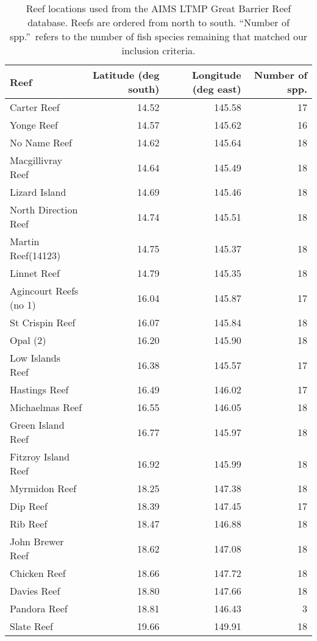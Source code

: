 \begin{table}[ht]
\begin{center}
\caption{Reef locations used from the AIMS LTMP Great Barrier Reef database. 
  Reefs are ordered from north to south. ``Number of spp.''\ refers to the 
  number of fish species remaining that matched our inclusion criteria.}
\label{tab:grb-meta}
{\footnotesize
\begin{tabular}{lrrr}
  \toprule
Reef & Latitude (deg south) & Longitude (deg east) & Number of spp. \\ 
  \midrule
Carter Reef & 14.52 & 145.58 & 17 \\ 
  Yonge Reef & 14.57 & 145.62 & 16 \\ 
  No Name Reef & 14.62 & 145.64 & 18 \\ 
  Macgillivray Reef & 14.64 & 145.49 & 18 \\ 
  Lizard Island & 14.69 & 145.46 & 18 \\ 
  North Direction Reef & 14.74 & 145.51 & 18 \\ 
  Martin Reef(14123) & 14.75 & 145.37 & 18 \\ 
  Linnet Reef & 14.79 & 145.35 & 18 \\ 
  Agincourt Reefs (no 1) & 16.04 & 145.87 & 17 \\ 
  St Crispin Reef & 16.07 & 145.84 & 18 \\ 
  Opal (2) & 16.20 & 145.90 & 18 \\ 
  Low Islands Reef & 16.38 & 145.57 & 17 \\ 
  Hastings Reef & 16.49 & 146.02 & 17 \\ 
  Michaelmas Reef & 16.55 & 146.05 & 18 \\ 
  Green Island Reef & 16.77 & 145.97 & 18 \\ 
  Fitzroy Island Reef & 16.92 & 145.99 & 18 \\ 
  Myrmidon Reef & 18.25 & 147.38 & 18 \\ 
  Dip Reef & 18.39 & 147.45 & 17 \\ 
  Rib Reef & 18.47 & 146.88 & 18 \\ 
  John Brewer Reef & 18.62 & 147.08 & 18 \\ 
  Chicken Reef & 18.66 & 147.72 & 18 \\ 
  Davies Reef & 18.80 & 147.66 & 18 \\ 
  Pandora Reef & 18.81 & 146.43 & 3 \\ 
  Slate Reef & 19.66 & 149.91 & 18 \\ 

\end{tabular}}
\end{center}
\end{table}
